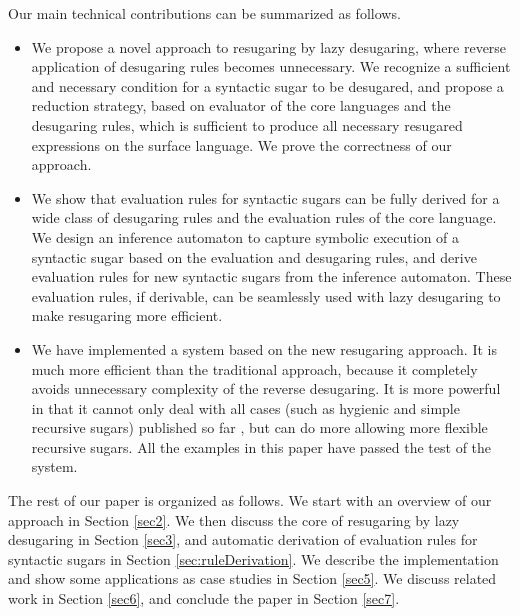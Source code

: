 Our main technical contributions can be summarized as follows.
\begin{itemize}
\item We propose a novel approach to resugaring by lazy desugaring, where reverse application of desugaring rules becomes unnecessary. We recognize a sufficient and necessary condition for a syntactic sugar to be desugared, and propose a reduction strategy, based on evaluator of the core languages and the desugaring rules, which is sufficient to produce all necessary resugared expressions on the surface language. We prove the correctness of our approach.



\item We show that evaluation rules for syntactic sugars can be fully derived for a wide  class of desugaring rules and the evaluation rules of the core language. We design an inference automaton to capture symbolic execution of a syntactic sugar based on the evaluation and desugaring rules, and derive evaluation rules for new syntactic sugars from the inference automaton. These evaluation rules, if derivable, can be seamlessly used with lazy desugaring to make resugaring more efficient.



\item We have implemented a system based on the new resugaring approach. It is much more efficient than the traditional approach, because it completely avoids unnecessary complexity of the reverse desugaring. It is more powerful in that it cannot only deal with all cases (such as hygienic and simple recursive sugars) published so far \cite{resugaring,hygienic}, but can do more allowing more flexible recursive sugars. All the examples in this paper have passed the test of the system.


\end{itemize}

The rest of our paper is organized as follows. We start with an overview of our approach in Section \ref{sec2}. We then discuss the core of resugaring by lazy desugaring in Section \ref{sec3}, and automatic derivation of evaluation rules for syntactic sugars in Section \ref{sec:ruleDerivation}. We describe the implementation and show some applications as case studies in Section \ref{sec5}. We discuss related  work in Section \ref{sec6}, and conclude the paper in Section \ref{sec7}.
